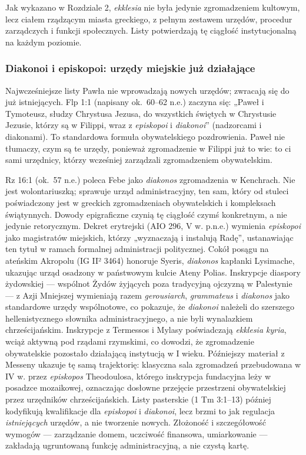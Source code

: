 Jak wykazano w Rozdziale 2, \textit{ekklesia} nie była jedynie zgromadzeniem kultowym, lecz ciałem rządzącym miasta greckiego, z pełnym zestawem urzędów, procedur zarządczych i funkcji społecznych.
Listy potwierdzają tę ciągłość instytucjonalną na każdym poziomie.

\subsubsection{Diakonoi i episkopoi: urzędy miejskie już działające}\label{subsubsec:diakonoi-and-episkopoi-civic-offices-already-functioning}
Najwcześniejsze listy Pawła nie wprowadzają nowych urzędów; zwracają się do już istniejących.
Flp 1:1 (napisany ok.~60–62 n.e.) zaczyna się: „Paweł i Tymoteusz, słudzy Chrystusa Jezusa, do wszystkich świętych w Chrystusie Jezusie, którzy są w Filippi, wraz z \textit{episkopoi} i \textit{diakonoi}” (nadzorcami i diakonami).
To standardowa formuła obywatelskiego pozdrowienia.
Paweł nie tłumaczy, czym są te urzędy, ponieważ zgromadzenie w Filippi już to wie: to ci sami urzędnicy, którzy wcześniej zarządzali zgromadzeniem obywatelskim.

Rz 16:1 (ok.~57 n.e.) poleca Febe jako \textit{diakonos} zgromadzenia w Kenchrach.
Nie jest wolontariuszką; sprawuje urząd administracyjny, ten sam, który od stuleci poświadczony jest w greckich zgromadzeniach obywatelskich i kompleksach świątynnych.
Dowody epigraficzne czynią tę ciągłość czymś konkretnym, a nie jedynie retorycznym.
Dekret erytrejski (AIO 296, V w. p.n.e.) wymienia \textit{episkopoi} jako magistratów miejskich, którzy „wyznaczają i instalują Radę”, ustanawiając ten tytuł w ramach formalnej administracji politycznej.
Cokół posągu na ateńskim Akropolu (IG II² 3464) honoruje Syeris, \textit{diakonos} kapłanki Lysimache, ukazując urząd osadzony w państwowym kulcie Ateny Polias.
Inskrypcje diaspory żydowskiej — wspólnot Żydów żyjących poza tradycyjną ojczyzną w Palestynie — z Azji Mniejszej wymieniają razem \textit{gerousiarch}, \textit{grammateus} i \textit{diakonos} jako standardowe urzędy wspólnotowe, co pokazuje, że \textit{diakonoi} należeli do szerszego hellenistycznego słownika administracyjnego, a nie byli wynalazkiem chrześcijańskim.
Inskrypcje z Termessos i Mylasy poświadczają \textit{ekklesia kyria}, wciąż aktywną pod rządami rzymskimi, co dowodzi, że zgromadzenie obywatelskie pozostało działającą instytucją w I wieku.
Późniejszy materiał z Messeny ukazuje tę samą trajektorię: klasyczna sala zgromadzeń przebudowana w IV w. przez \textit{episkopos} Theodoulosa, którego inskrypcja fundacyjna leży w posadzce mozaikowej, oznaczając dosłowne przejęcie przestrzeni obywatelskiej przez urzędników chrześcijańskich.
Listy pasterskie (1 Tm 3:1–13) później kodyfikują kwalifikacje dla \textit{episkopoi} i \textit{diakonoi}, lecz brzmi to jak regulacja \emph{istniejących} urzędów, a nie tworzenie nowych.
Złożoność i szczegółowość wymogów — zarządzanie domem, uczciwość finansowa, umiarkowanie — zakładają ugruntowaną funkcję administracyjną, a nie czystą kartę.

